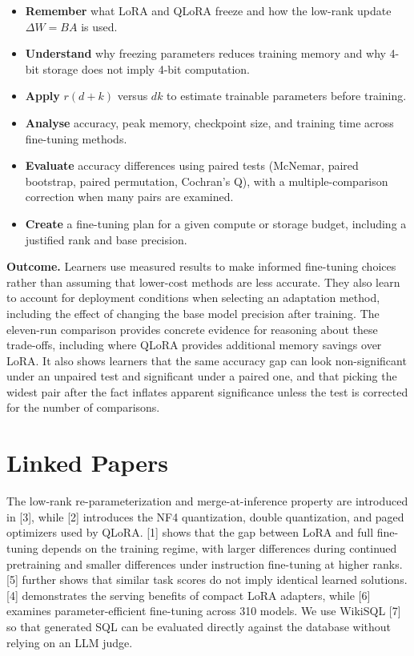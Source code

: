 \documentclass{article}
\begin{document}
\begin{itemize}
\item \textbf{Remember} what LoRA and QLoRA freeze and how the low-rank update $\Delta W = BA$ is used.
\item \textbf{Understand} why freezing parameters reduces training memory and why 4-bit storage does not imply 4-bit computation.
\item \textbf{Apply} $r(d{+}k)$ versus $dk$ to estimate trainable parameters before training.
\item \textbf{Analyse} accuracy, peak memory, checkpoint size, and training time across fine-tuning methods.
\item \textbf{Evaluate} accuracy differences using paired tests (McNemar, paired bootstrap, paired permutation, Cochran's Q), with a multiple-comparison correction when many pairs are examined.
\item \textbf{Create} a fine-tuning plan for a given compute or storage budget, including a justified rank and base precision.
\end{itemize}

\textbf{Outcome.} Learners use measured results to make informed fine-tuning choices rather than assuming that lower-cost methods are less accurate. They also learn to account for deployment conditions when selecting an adaptation method, including the effect of changing the base model precision after training. The eleven-run comparison provides concrete evidence for reasoning about these trade-offs, including where QLoRA provides additional memory savings over LoRA. It also shows learners that the same accuracy gap can look non-significant under an unpaired test and significant under a paired one, and that picking the widest pair after the fact inflates apparent significance unless the test is corrected for the number of comparisons.

\section{Linked Papers}

The low-rank re-parameterization and merge-at-inference property are introduced in [3], while [2] introduces the NF4 quantization, double quantization, and paged optimizers used by QLoRA. [1] shows that the gap between LoRA and full fine-tuning depends on the training regime, with larger differences during continued pretraining and smaller differences under instruction fine-tuning at higher ranks. [5] further shows that similar task scores do not imply identical learned solutions. [4] demonstrates the serving benefits of compact LoRA adapters, while [6] examines parameter-efficient fine-tuning across 310 models. We use WikiSQL [7] so that generated SQL can be evaluated directly against the database without relying on an LLM judge.
\end{document}
